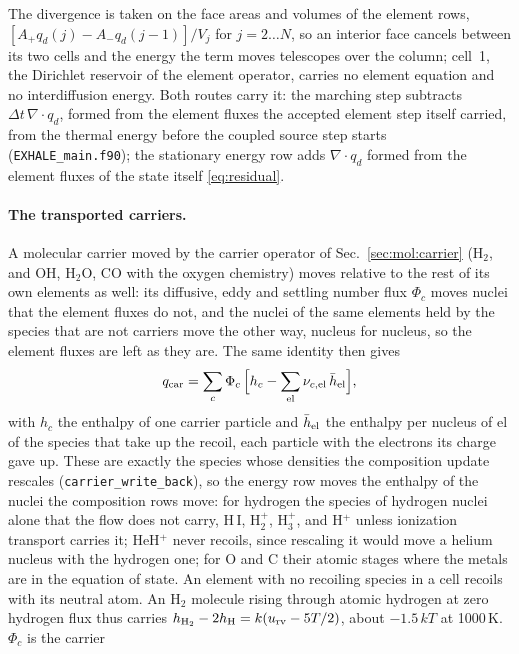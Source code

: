 The divergence is taken on the face areas and volumes of the element rows,
$[A_+q_d(j) - A_-q_d(j-1)]/V_j$ for $j = 2\ldots N$, so an interior face
cancels between its two cells and the energy the term moves telescopes over
the column; cell~1, the Dirichlet reservoir of the element operator, carries
no element equation and no interdiffusion energy.  Both routes carry it: the
marching step subtracts $\Delta t\,\nabla\!\cdot q_d$, formed from the element
fluxes the accepted element step itself carried, from the thermal energy
before the coupled source step starts (\texttt{EXHALE\_main.f90}); the
stationary energy row adds $\nabla\!\cdot q_d$ formed from the element fluxes
of the state itself \eqref{eq:residual}.

\paragraph{The transported carriers.}  A molecular carrier moved by the
carrier operator of Sec.~\ref{sec:mol:carrier} (H$_2$, and OH, H$_2$O, CO
with the oxygen chemistry) moves relative to the rest of its own elements as
well: its diffusive, eddy and settling number flux $\Phi_c$ moves nuclei that
the element fluxes do not, and the nuclei of the same elements held by the
species that are not carriers move the other way, nucleus for nucleus, so the
element fluxes are left as they are.  The same identity then gives
%
\begin{equation}
  q_{\rm car} = \sum_c \Phi_c\,\Bigl[h_c - \sum_{\rm el}\nu_{c,\rm el}\,
  \bar h_{\rm el}\Bigr],
  \label{eq:mol:qcar}
\end{equation}
%
with $h_c$ the enthalpy of one carrier particle and $\bar h_{\rm el}$ the
enthalpy per nucleus of el of the species that take up the recoil, each
particle with the electrons its charge gave up.  These are exactly the species
whose densities the composition update rescales (\texttt{carrier\_write\_back}),
so the energy row moves the enthalpy of the nuclei the composition rows move:
for hydrogen the species of hydrogen nuclei alone that the flow does not carry,
H\,I, H$_2^+$, H$_3^+$, and H$^+$ unless ionization transport carries it; HeH$^+$
never recoils, since rescaling it would move a helium nucleus with the
hydrogen one; for O and C their atomic stages where the metals are in the
equation of state.  An element with no recoiling species in a cell recoils
with its neutral atom.  An H$_2$ molecule rising through atomic
hydrogen at zero hydrogen flux thus carries $h_{\rm H_2} - 2h_{\rm H} =
k(u_{\rm rv} - 5T/2)$, about $-1.5\,kT$ at 1000\,K.  $\Phi_c$ is the carrier
